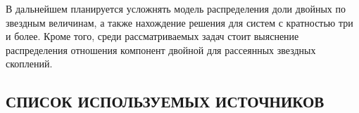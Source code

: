 \documentclass[a4paper,12pt]{article}
\begin{document}
В дальнейшем планируется усложнять модель распределения доли двойных по звездным величинам, а также нахождение решения для систем с кратностью три и более. Кроме того, среди рассматриваемых задач стоит выяснение распределения отношения компонент двойной для рассеянных звездных скоплений.
\newpage

\begin{center}
\section{\bf{СПИСОК ИСПОЛЬЗУЕМЫХ ИСТОЧНИКОВ}}
\end{center}



\end{document}

